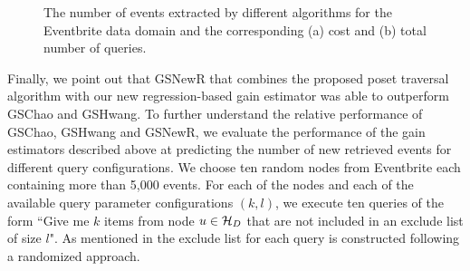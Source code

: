 \fi
\ifpaper
\begin{figure}[h]
	\begin{center}
	\caption{The number of events extracted by different algorithms for the Eventbrite data domain and the corresponding (a) cost and (b) total number of queries.}
	\end{center}
	\vspace{-15pt}
\end{figure}
\fi

Finally, we point out that GSNewR that combines the proposed poset traversal algorithm with our new regression-based gain estimator was able to outperform GSChao and GSHwang. To further understand the relative performance of GSChao, GSHwang and GSNewR, we evaluate the performance of the gain estimators described above at predicting the number of new retrieved events for different query configurations. We choose ten random nodes from Eventbrite each containing more than 5,000 events. For each of the nodes and each of the available query parameter configurations $(k,l)$, we execute ten queries of the form ``Give me $k$ items from node $u \in \mathcal{H}_D$ that are not included in an exclude list of size $l$". As mentioned in  the exclude list for each query is constructed following a randomized approach. 

